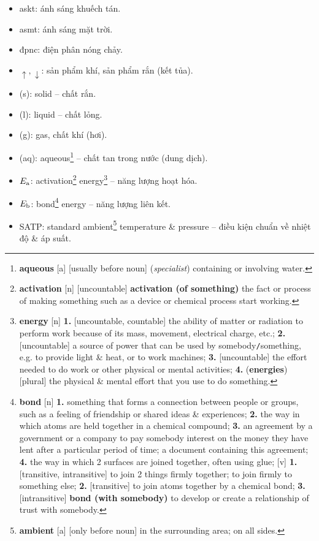 \documentclass[oneside]{book}
\numberwithin{equation}{section}
\begin{document}
\begin{itemize}
	\item askt: ánh sáng khuếch tán.
	\item asmt: ánh sáng mặt trời.
	\item đpnc: điện phân nóng chảy.
	\item $\uparrow,\downarrow$: sản phẩm khí, sản phẩm rắn (kết tủa).
	\item (s): solid -- chất rắn.
	\item (l): liquid -- chất lỏng.
	\item (g): gas, chất khí (hơi).
	\item (aq): aqueous\footnote{\textbf{aqueous} [a] [usually before noun] (\textit{specialist}) containing or involving water.} -- chất tan trong nước (dung dịch).
	\item $E_{\rm a}$: activation\footnote{\textbf{activation} [n] [uncountable] \textbf{activation (of something)} the fact or process of making something such as a device or chemical process start working.} energy\footnote{\textbf{energy} [n] \textbf{1.} [uncountable, countable] the ability of matter or radiation to perform work because of its mass, movement, electrical charge, etc.; \textbf{2.} [uncountable] a source of power that can be used by somebody\texttt{/}something, e.g. to provide light \& heat, or to work machines; \textbf{3.} [uncountable] the effort needed to do work or other physical or mental activities; \textbf{4.} (\textbf{energies}) [plural] the physical \& mental effort that you use to do something.} -- năng lượng hoạt hóa.
	\item $E_{\rm b}$: bond\footnote{\textbf{bond} [n] \textbf{1.} something that forms a connection between people or groups, such as a feeling of friendship or shared ideas \& experiences; \textbf{2.} the way in which atoms are held together in a chemical compound; \textbf{3.} an agreement by a government or a company to pay somebody interest on the money they have lent after a particular period of time; a document containing this agreement; \textbf{4.} the way in which 2 surfaces are joined together, often using glue; [v] \textbf{1.} [transitive, intransitive] to join 2 things firmly together; to join firmly to something else; \textbf{2.} [transitive] to join atoms together by a chemical bond; \textbf{3.} [intransitive] \textbf{bond (with somebody)} to develop or create a relationship of trust with somebody.} energy -- năng lượng liên kết.
	\item SATP: standard ambient\footnote{\textbf{ambient} [a] [only before noun] in the surrounding area; on all sides.} temperature \& pressure -- điều kiện chuẩn về nhiệt độ \& áp suất.

\end{itemize}
\end{document}
